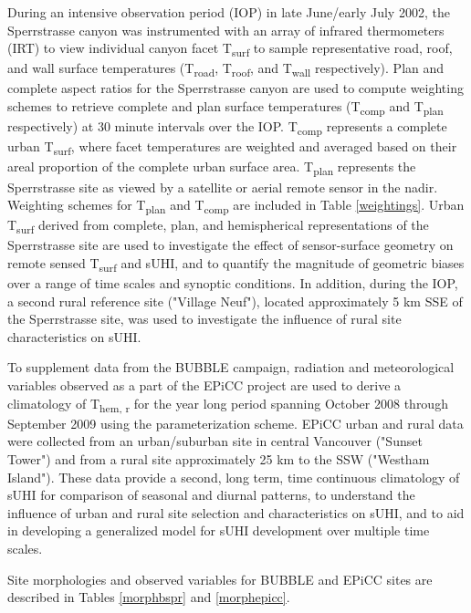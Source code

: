 \begin{bibunit}
During an intensive observation period (IOP) in late June/early July 2002, the Sperrstrasse canyon was instrumented with an array of infrared thermometers (IRT) to view individual canyon facet T\textsubscript{surf} to sample representative road, roof, and wall surface temperatures (T\textsubscript{road}, T\textsubscript{roof}, and T\textsubscript{wall} respectively). Plan and complete aspect ratios for the Sperrstrasse canyon are used to compute weighting schemes to retrieve complete and plan surface temperatures (T\textsubscript{comp} and T\textsubscript{plan} respectively) at 30 minute intervals over the IOP. T\textsubscript{comp} represents a complete urban T\textsubscript{surf}, where facet temperatures are weighted and averaged based on their areal proportion of the complete urban surface area. T\textsubscript{plan} represents the Sperrstrasse site as viewed by a satellite or aerial remote sensor in the nadir. Weighting schemes for T\textsubscript{plan} and T\textsubscript{comp} are included in Table \ref{weightings}. Urban T\textsubscript{surf} derived from complete, plan, and hemispherical representations of the Sperrstrasse site are used to investigate the effect of sensor-surface geometry on remote sensed T\textsubscript{surf} and sUHI, and to quantify the magnitude of geometric biases over a range of time scales and synoptic conditions. In addition, during the IOP, a second rural reference site ("Village Neuf"), located approximately 5 \si{\kilo\meter} SSE of the Sperrstrasse site, was used to investigate the influence of rural site characteristics on sUHI. 

To supplement data from the BUBBLE campaign, radiation and meteorological variables observed as a part of the EPiCC project are used to derive a climatology of T\textsubscript{hem, r} for the year long period spanning October 2008 through September 2009 using the parameterization scheme. EPiCC urban and rural data were collected from an urban/suburban site in central Vancouver ("Sunset Tower") and from a rural site approximately 25 \si{\kilo\meter} to the SSW ("Westham Island"). These data provide a second, long term, time continuous climatology of sUHI for comparison of seasonal and diurnal patterns, to understand the influence of urban and rural site selection and characteristics on sUHI, and to aid in developing a generalized model for sUHI development over multiple time scales. 

Site morphologies and observed variables for BUBBLE and EPiCC sites are described in Tables \ref{morphbspr} and \ref{morphepicc}.


\end{bibunit}
